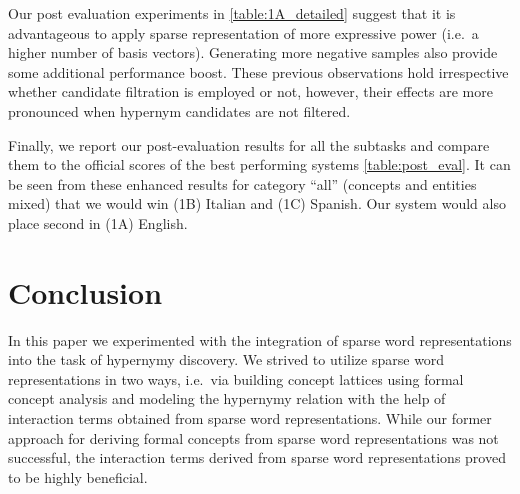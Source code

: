 \documentclass[11pt,a4paper]{article}
\begin{document}


Our post evaluation experiments in \autoref{table:1A_detailed} suggest that it 
is advantageous to apply sparse representation of more expressive power (i.e.~a 
higher number of basis vectors). Generating more negative samples also provide 
some additional performance boost. These previous observations hold 
irrespective whether candidate filtration is employed or not, however, their 
effects are more pronounced when hypernym candidates are not filtered.

Finally, we report our post-evaluation results for all the subtasks and compare
them to the official scores  of the best performing systems 
\autoref{table:post_eval}. It can be seen from these enhanced results for 
category ``all'' (concepts and entities mixed) that we would win (1B) Italian 
and (1C) Spanish. Our system would also place second in (1A) English.



\section{Conclusion}

In this paper we experimented with the integration of sparse word 
representations into the task of hypernymy discovery. We strived to utilize 
sparse word representations in two ways, i.e.~via building concept lattices 
using formal concept analysis and modeling the hypernymy relation with the help 
of interaction terms obtained from sparse word representations. While our 
former approach for deriving formal concepts from sparse word representations 
was not successful, the interaction terms derived from sparse word 
representations proved to be highly beneficial.




\end{document}
